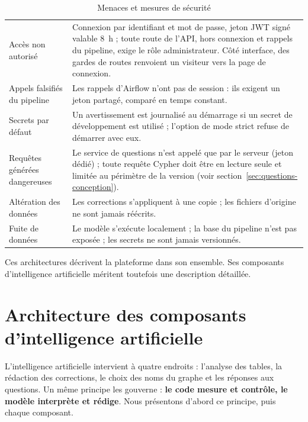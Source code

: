 \begin{table}[H]
\centering
\small
\begin{tabular}{|L{3.8cm}|L{10.2cm}|}
\hline
{} &  \\ \hline
Accès non autorisé & Connexion par identifiant et mot de passe, jeton JWT signé valable 8~h ; toute route de l'API, hors connexion et rappels du pipeline, exige le rôle administrateur. Côté interface, des gardes de routes renvoient un visiteur vers la page de connexion. \\ \hline
Appels falsifiés du pipeline & Les rappels d'Airflow n'ont pas de session : ils exigent un jeton partagé, comparé en temps constant. \\ \hline
Secrets par défaut & Un avertissement est journalisé au démarrage si un secret de développement est utilisé ; l'option de mode strict refuse de démarrer avec eux. \\ \hline
Requêtes générées dangereuses & Le service de questions n'est appelé que par le serveur (jeton dédié) ; toute requête Cypher doit être en lecture seule et limitée au périmètre de la version (voir section~\ref{sec:questions-conception}). \\ \hline
Altération des données & Les corrections s'appliquent à une copie ; les fichiers d'origine ne sont jamais réécrits. \\ \hline
Fuite de données & Le modèle s'exécute localement ; la base du pipeline n'est pas exposée ; les secrets ne sont jamais versionnés. \\ \hline
\end{tabular}
\caption{Menaces et mesures de sécurité}
\label{tab:securite}
\end{table}

Ces architectures décrivent la plateforme dans son ensemble. Ses composants d'intelligence artificielle méritent toutefois une description détaillée.

\section{Architecture des composants d'intelligence artificielle}

L'intelligence artificielle intervient à quatre endroits : l'analyse des tables, la rédaction des corrections, le choix des noms du graphe et les réponses aux questions. Un même principe les gouverne : \textbf{le code mesure et contrôle, le modèle interprète et rédige}. Nous présentons d'abord ce principe, puis chaque composant.

